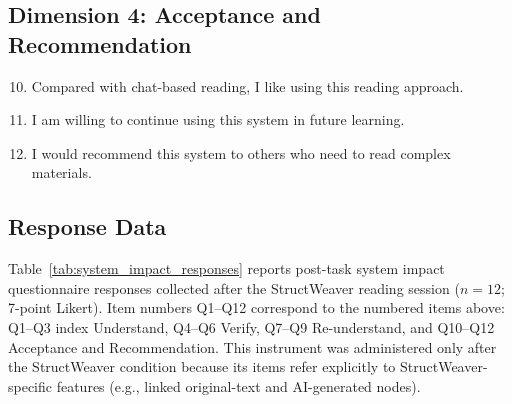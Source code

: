 \documentclass[manuscript,review,anonymous]{acmart}
\begin{document}
\subsection*{Dimension 4: Acceptance and Recommendation}
\begin{enumerate}[label=\arabic*.]
 \setcounter{enumi}{9}
 \item Compared with chat-based reading, I like using this reading approach.
 \item I am willing to continue using this system in future learning.
 \item I would recommend this system to others who need to read complex materials.
\end{enumerate}

\subsection{Response Data}
\label{appendix:system-impact-responses}

Table~\ref{tab:system_impact_responses} reports post-task system impact questionnaire responses collected after the StructWeaver reading session ($n=12$; 7-point Likert). Item numbers Q1--Q12 correspond to the numbered items above: Q1--Q3 index Understand, Q4--Q6 Verify, Q7--Q9 Re-understand, and Q10--Q12 Acceptance and Recommendation. This instrument was administered only after the StructWeaver condition because its items refer explicitly to StructWeaver-specific features (e.g., linked original-text and AI-generated nodes).
\end{document}
